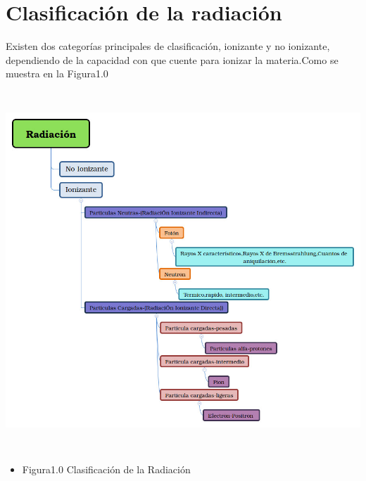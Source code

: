\documentclass[12pt,fleqn]{book} %
\numberwithin{equation}{section} %
\numberwithin{figure}{section} %
\numberwithin{table}{section} %
\begin{document}
\section{Clasificación de la radiación}
Existen dos categorías principales de clasificación,
ionizante y no ionizante, dependiendo de la capacidad con que cuente para ionizar la materia.Como se muestra en la Figura1.0 
\begin{center}
\includegraphics[height=13.5cm]{mapa}
\end{center}

\begin{center}
\begin{itemize}
\item Figura1.0 Clasificación de la Radiación
\end{itemize}
\end{center}
\end{document}
